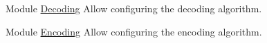 
\begin{DoxyRefList}
\item[Module \mbox{\hyperlink{group__Decoding}{Decoding}} ]\label{todo__todo000002}%
%
Allow configuring the decoding algorithm.  
\item[Module \mbox{\hyperlink{group__Encoding}{Encoding}} ]\label{todo__todo000001}%
%
Allow configuring the encoding algorithm.
\end{DoxyRefList}
